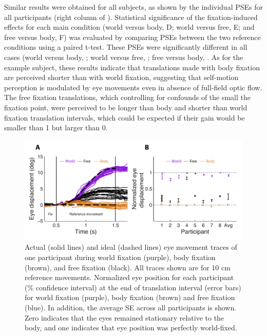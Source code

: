 Similar results were obtained for all subjects, as shown by the individual PSEs for all participants (right column of ). Statistical significance of the fixation-induced effects for each main condition (world versus body, D; world versus free, E; and free versus body, F) was evaluated by comparing PSEs between the two reference conditions using a paired t-test. These PSEs were significantly different in all cases (world versus body, ; world versus free, ; free versus body, . As for the example subject, these results indicate that translations made with body fixation are perceived shorter than with world fixation, suggesting that self-motion perception is modulated by eye movements even in absence of full-field optic flow. The free fixation translations, which controlling for confounds of the small the fixation point, were perceived to be longer than body and shorter than world fixation translation intervals, which could be expected if their gain would be smaller than 1 but larger than 0.

\begin{figure}
    \includegraphics[width=1.0\textwidth]{src/paper3/figure3.pdf}

    \caption{ Actual (solid lines) and ideal (dashed lines) eye movement traces of one participant during world fixation (purple), body fixation (brown), and free fixation (black). All traces shown are for 10 \si{\centi\metre} reference movements.  Normalized eye position for each participant (\% confidence interval) at the end of translation interval (error bars) for world fixation (purple), body fixation (brown) and free fixation (blue). In addition, the average {\textpm}SE across all participants is shown. Zero indicates that the eyes remained stationary relative to the body, and one indicates that eye position was perfectly world-fixed.}
    \label{p3:fig3}
\end{figure}

